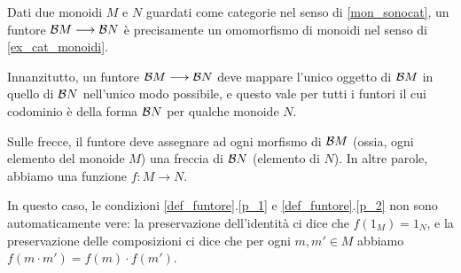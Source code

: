 \begin{example}\label{exa_funtori_da_gruppi}
	Dati due monoidi \(M\) e \(N\) guardati come categorie nel senso di \ref{mon_sonocat}, un funtore \(\mathcal{B} M\longrightarrow \mathcal{B} N\) è precisamente un omomorfismo di monoidi nel senso di \ref{ex_cat_monoidi}.

	Innanzitutto, un funtore \(\mathcal{B} M\longrightarrow \mathcal{B} N\) deve mappare l'unico oggetto di \(\mathcal{B} M\) in quello di \(\mathcal{B} N\) nell'unico modo possibile, e questo vale per tutti i funtori il cui codominio è della forma \(\mathcal{B} N\) per qualche monoide \(N\).

	Sulle frecce, il funtore deve assegnare ad ogni morfismo di \(\mathcal{B} M\) (ossia, ogni elemento del monoide \(M\)) una freccia di \(\mathcal{B} N\) (elemento di \(N\)). In altre parole, abbiamo una funzione \(f:M\to N\).

	In questo caso, le condizioni \ref{def_funtore}.\ref{p_1} e \ref{def_funtore}.\ref{p_2} non sono automaticamente vere: la preservazione dell'identità ci dice che \(f(1_M)=1_N\), e la preservazione delle composizioni ci dice che per ogni \(m,m'\in M\) abbiamo \(f(m\cdot m')=f(m)\cdot f(m')\).
\end{example}
